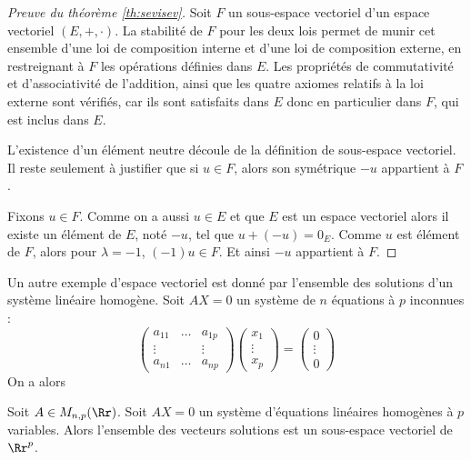 \documentclass[class=report,crop=false]{standalone}
\begin{document}
\begin{proof}[Preuve du théorème \ref{th:sevisev}]
Soit $F$ un sous-espace vectoriel d'un espace vectoriel $(E,+,\cdot)$.
La stabilité de $F$ pour les deux lois permet de munir cet ensemble d'une loi de composition interne
et d'une loi de composition externe, en restreignant à $F$ les opérations définies dans $E$.
Les propriétés de commutativité et d'associativité de l'addition, ainsi que les quatre axiomes
relatifs à la loi externe sont vérifiés, car ils sont satisfaits dans $E$ donc en particulier dans $F$,
qui est inclus dans $E$.

L'existence d'un élément neutre découle de la définition de sous-espace vectoriel.
Il reste seulement à justifier que si $u\in F$, alors son symétrique $-u$ appartient à $F$.

Fixons $u\in F$. Comme on a aussi $u\in E$ et que $E$ est un espace vectoriel alors il existe
un élément de $E$, noté $-u$, tel que  $u+(-u)=0_{E}$.
Comme  $u$ est élément de $F$,  alors pour $\lambda=-1$, $(-1)u \in F$.
Et ainsi $-u$ appartient à $F$.
\end{proof}

\bigskip


Un autre exemple d'espace vectoriel est donné par l'ensemble des solutions d'un système
linéaire homogène. Soit $AX = 0$ un système de $n$ équations à $p$ inconnues :
 $$  \left(
\begin{array}{lcl}
a_{11} & \dots & a_{1p}\\
\vdots &&\vdots\\
a_{n1} & \dots & a_{np}
\end{array}\right)
  \left(
\begin{array}{c}
x_1 \\ \vdots\\x_p
\end{array}\right) =   \left(
\begin{array}{c}
0\\ \vdots \\ 0
\end{array}\right)
$$
On a alors
\begin{theoreme}
\label{th:axsev}
Soit $A \in M_{n,p}(\Rr)$.
Soit $AX = 0$ un système d'équations linéaires homogènes à $p$ variables.
Alors l'ensemble des vecteurs solutions est un sous-espace vectoriel de $\Rr^p$.
\end{theoreme}
\end{document}
